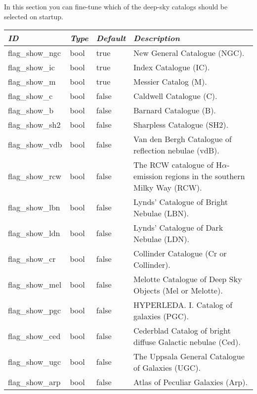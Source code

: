 \subsection{}
In this section you can fine-tune which of the deep-sky catalogs should be selected on startup.

\begin{longtable}{l|l|l|p{90mm}}\toprule
\emph{ID} & \emph{Type} & \emph{Default} & \emph{Description}\\\midrule
flag\_show\_ngc   & bool & true  & New General Catalogue (NGC). \\%
flag\_show\_ic    & bool & true  & Index Catalogue (IC). \\%
flag\_show\_m     & bool & true  & Messier Catalog (M). \\%
flag\_show\_c     & bool & false & Caldwell Catalogue (C). \\%
flag\_show\_b     & bool & false & Barnard Catalogue (B). \\%
flag\_show\_sh2   & bool & false & Sharpless Catalogue (SH2). \\%
flag\_show\_vdb   & bool & false & Van den Bergh Catalogue of reflection nebulae (vdB). \\%
flag\_show\_rcw   & bool & false & The RCW catalogue of H$\alpha$-emission regions in the southern Milky Way (RCW). \\%
flag\_show\_lbn   & bool & false & Lynds' Catalogue of Bright Nebulae (LBN). \\%
flag\_show\_ldn   & bool & false & Lynds' Catalogue of Dark Nebulae (LDN). \\%
flag\_show\_cr    & bool & false & Collinder Catalogue (Cr or Collinder). \\%
flag\_show\_mel   & bool & false & Melotte Catalogue of Deep Sky Objects (Mel or Melotte).  \\%
flag\_show\_pgc   & bool & false & HYPERLEDA. I. Catalog of galaxies (PGC). \\%
flag\_show\_ced   & bool & false & Cederblad Catalog of bright diffuse Galactic nebulae (Ced). \\%
flag\_show\_ugc   & bool & false & The Uppsala General Catalogue of Galaxies (UGC). \\%
flag\_show\_arp   & bool & false & Atlas of Peculiar Galaxies (Arp). \\%

\end{longtable}
